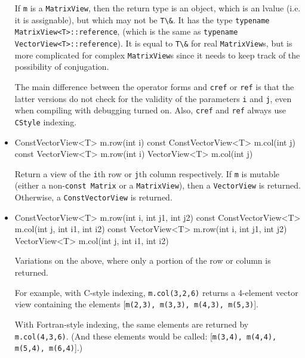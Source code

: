 \documentclass[twoside,letterpaper,11pt]{article}
\renewcommand{\tt}[1]{{\lstinline {#1}}}
\begin{document}
\begin{itemize}
If \tt{m} is a \tt{MatrixView}, then the return type is an object,
which is an lvalue (i.e. it is assignable), but which may not be \tt{T\&}.
It has the type \tt{typename MatrixView<T>::reference}, 
(which is the same as \tt{typename VectorView<T>::reference}).
It is equal to \tt{T\&} for real \tt{MatrixView}s, but is
more complicated for complex \tt{MatrixView}s since it needs to 
keep track of the possibility of conjugation.

The main difference between the operator forms and \tt{cref} or \tt{ref} is that the latter versions do not
check for the validity of the parameters \tt{i} and \tt{j}, even when compiling with debugging turned on.
Also, \tt{cref} and \tt{ref} always use \tt{CStyle} indexing.

\item
\begin{tmvcode}
ConstVectorView<T> m.row(int i) const
ConstVectorView<T> m.col(int j) const
VectorView<T> m.row(int i)
VectorView<T> m.col(int j)
\end{tmvcode}
Return a view of the \tt{i}th row or \tt{j}th column respectively.
If \tt{m} is mutable (either a non-\tt{const Matrix} or a \tt{MatrixView}),
then a \tt{VectorView} is returned.  Otherwise, a \tt{ConstVectorView}
is returned.

\item
\begin{tmvcode}
ConstVectorView<T> m.row(int i, int j1, int j2) const
ConstVectorView<T> m.col(int j, int i1, int i2) const
VectorView<T> m.row(int i, int j1, int j2)
VectorView<T> m.col(int j, int i1, int i2) 
\end{tmvcode}
Variations on the above, where only a portion of the row or column
is returned.  

For example, with C-style indexing, \tt{m.col(3,2,6)} returns a 4-element
vector view containing the elements
[\tt{m(2,3), m(3,3), m(4,3), m(5,3)}].

With Fortran-style indexing, the same elements are returned by \tt{m.col(4,3,6)}. 
(And these elements would be called: [\tt{m(3,4), m(4,4), m(5,4), m(6,4)}].)


\end{itemize}
\end{document}
